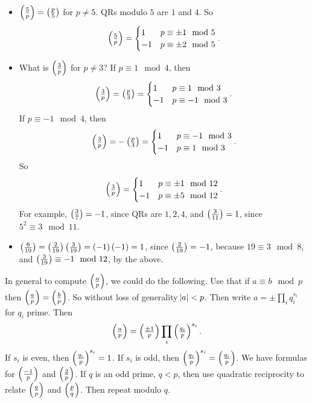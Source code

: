 \begin{example*}
\hfill
\begin{itemize}
\item $ \jacobi{5}{p} = \jacobi{p}{5} $ for $ p \ne 5 $. QRs modulo $ 5 $ are $ 1 $ and $ 4 $. So
$$ \jacobi{5}{p} =
\begin{cases}
1 & p \equiv \pm 1 \mod 5 \\
-1 & p \equiv \pm 2 \mod 5
\end{cases}.
$$

\item What is $ \jacobi{3}{p} $ for $ p \ne 3 $? If $ p \equiv 1 \mod 4 $, then
$$ \jacobi{3}{p} = \jacobi{p}{3} =
\begin{cases}
1 & p \equiv 1 \mod 3 \\
-1 & p \equiv -1 \mod 3
\end{cases}.
$$
If $ p \equiv -1 \mod 4 $, then
$$ \jacobi{3}{p} = -\jacobi{p}{3} =
\begin{cases}
1 & p \equiv -1 \mod 3 \\
-1 & p \equiv 1 \mod 3
\end{cases}.
$$
So
$$ \jacobi{3}{p} =
\begin{cases}
1 & p \equiv \pm 1 \mod 12 \\
-1 & p \equiv \pm 5 \mod 12
\end{cases}.
$$
For example, $ \jacobi{3}{7} = -1 $, since QRs are $ 1, 2, 4 $, and $ \jacobi{3}{11} = 1 $, since $ 5^2 \equiv 3 \mod 11 $.
\item $ \jacobi{6}{19} = \jacobi{2}{19}\jacobi{3}{19} = \br{-1}\br{-1} = 1 $, since $ \jacobi{2}{19} = -1 $, because $ 19 \equiv 3 \mod 8 $, and $ \jacobi{3}{19} \equiv -1 \mod 12 $, by the above.
\end{itemize}
\end{example*}

In general to compute $ \jacobi{a}{p} $, we could do the following. Use that if $ a \equiv b \mod p $ then $ \jacobi{a}{p} = \jacobi{b}{p} $. So without loss of generality $ \abs{a} < p $. Then write $ a = \pm \prod_i q_i^{s_i} $ for $ q_i $ prime. Then
$$ \jacobi{a}{p} = \jacobi{\pm 1}{p} \prod_i \jacobi{q_i}{p}^{s_i}. $$
If $ s_i $ is even, then $ \jacobi{q_i}{p}^{s_i} = 1 $. If $ s_i $ is odd, then $ \jacobi{q_i}{p}^{s_i} = \jacobi{q_i}{p} $. We have formulas for $ \jacobi{-1}{p} $ and $ \jacobi{2}{p} $. If $ q $ is an odd prime, $ q < p $, then use quadratic reciprocity to relate $ \jacobi{q}{p} $ and $ \jacobi{p}{q} $. Then repeat modulo $ q $.


